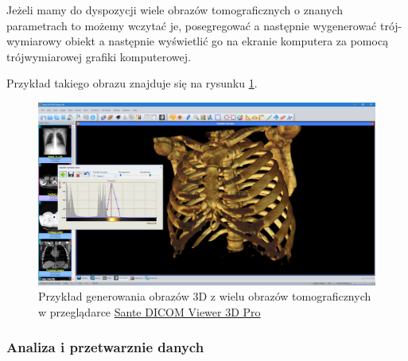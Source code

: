 Jeżeli mamy do dyspozycji wiele obrazów tomograficznych o znanych parametrach to możemy wczytać je, posegregować a następnie wygenerować trój-wymiarowy obiekt a następnie wyświetlić go na ekranie komputera za pomocą trójwymiarowej grafiki komputerowej.

Przykład takiego obrazu znajduje się na rysunku \ref{fig:dicomviewer002}.

\begin{figure}[!htbp]
      \centering
      \includegraphics[width=\textwidth]{img/dicom-viewer-002.png}
      \caption{Przykład generowania obrazów 3D z wielu obrazów tomograficznych w przeglądarce \href{https://www.santesoft.com/win/sante-dicom-viewer-3d-pro/sante-dicom-viewer-3d-pro.html}{Sante DICOM Viewer 3D Pro}}
      \label{fig:dicomviewer002}
\end{figure}

\subsubsection{Analiza i przetwarznie danych}

